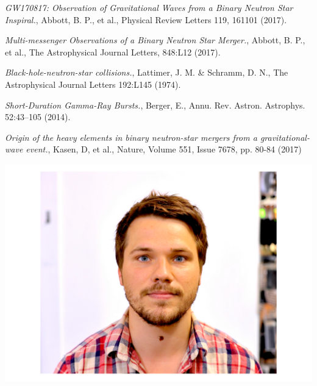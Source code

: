 \documentclass[twocolumn]{article}
\begin{document}
\begin{thebibliography}{9}
 \emph{GW170817: Observation of Gravitational Waves from a Binary Neutron Star Inspiral.},
Abbott, B. P., et al., Physical Review Letters 119, 161101 (2017).

 \emph{Multi-messenger Observations of a Binary Neutron Star Merger.},
Abbott, B. P., et al., The Astrophysical Journal Letters, 848:L12 (2017).

 \emph{Black-hole-neutron-star collisions.},
Lattimer, J. M. \& Schramm, D. N., The Astrophysical Journal Letters 192:L145 (1974).

 \emph{Short-Duration Gamma-Ray Bursts.},
Berger, E., Annu. Rev. Astron. Astrophys. 52:43–105 (2014).

 \emph{Origin of the heavy elements in binary neutron-star
mergers from a gravitational-wave event.},
Kasen, D, et al., Nature, Volume 551, Issue 7678, pp. 80-84 (2017)

\end{thebibliography}

\begin{center}
\includegraphics[width=\columnwidth]{me.pdf}
\end{center}
\end{document}
